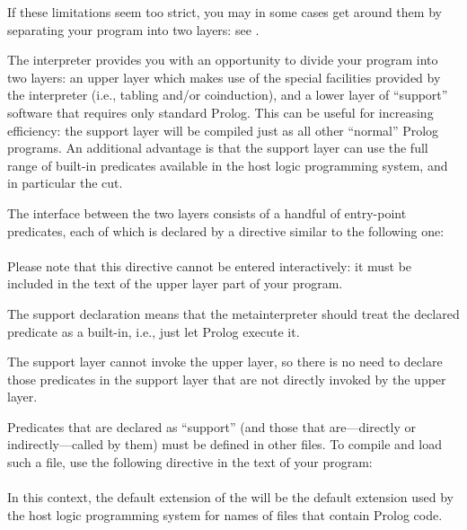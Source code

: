 If these limitations seem too strict, you may in some cases get around them
by separating your program into two layers: see .



The interpreter provides you with an opportunity to divide your program into
two layers: an upper layer which makes use of the special facilities provided
by the interpreter (i.e., tabling and/or coinduction), and a lower layer of
``support'' software that requires only standard Prolog.  This can be useful
for increasing efficiency: the support layer will be compiled just as all
other ``normal'' Prolog programs.  An additional advantage is that the
support layer can use the full range of built-in predicates available in the
host logic programming system, and in particular the cut.

The interface between the two layers consists of a handful of entry-point
predicates, each of which is  declared by a directive similar to the
following one:\\
\ind{}%
\label{dir:support}\\
Please note that this directive cannot be entered interactively: it must be
included in the text of the upper layer part of your program.

The support declaration means that the metainterpreter should treat the
declared predicate as a built-in, i.e., just let Prolog execute it.

The support layer cannot invoke the upper layer, so there is no need to
declare those predicates in the support layer that are not directly invoked
by the upper layer.

Predicates that are declared as ``support'' (and those that are---directly or
indirectly---called by them) must be defined in other files.
To compile and load such a file, use the following directive in the text of
your program:\\
\ind{}%
\label{dir:load-support}\\
In this context, the default extension of the  will be the
default extension used by the host logic programming system for names
of files that contain Prolog code.%
%
%



